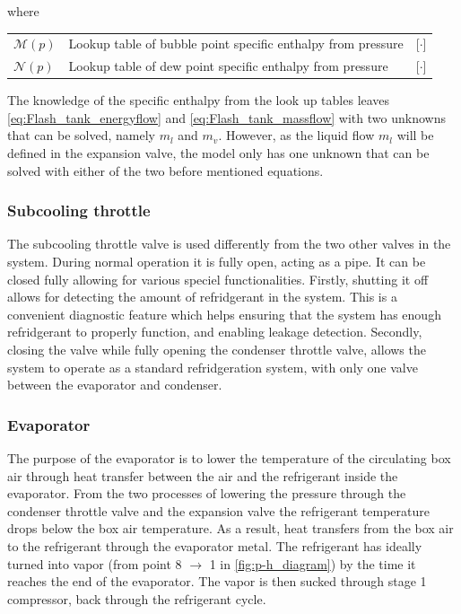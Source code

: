 where

\begin{center}
	\begin{tabular}{l p{8cm} l}
		$\mathcal{M}(p)$ & Lookup table of bubble point specific enthalpy from pressure & [$\cdot$] \\
		$\mathcal{N}(p)$ & Lookup table of dew point specific enthalpy from pressure    & [$\cdot$]
	\end{tabular}
\end{center}

The knowledge of the specific enthalpy from the look up tables leaves \cref{eq:Flash_tank_energyflow} and \cref{eq:Flash_tank_massflow} with two unknowns that can be solved, namely $ m_l $ and $ m_v $. However, as the liquid flow $ m_l $ will be defined in the expansion valve, the model only has one unknown that can be solved with either of the two before mentioned equations.

\subsubsection{Subcooling throttle}
The subcooling throttle valve is used differently from the two other valves in the system. During normal operation it is fully open, acting as a pipe. It can be closed fully allowing for various speciel functionalities. Firstly, shutting it off allows for detecting the amount of refridgerant in the system. This is a convenient diagnostic feature which helps ensuring that the system has enough refridgerant to properly function, and enabling leakage detection. Secondly, closing the valve while fully opening the condenser throttle valve, allows the system to operate as a standard refridgeration system, with only one valve between the evaporator and condenser.


\subsubsection{Evaporator}\label{sec:evaporator}
The purpose of the evaporator is to lower the temperature of the circulating box air through heat transfer between the air and the refrigerant inside the evaporator. From the two processes of lowering the pressure through the condenser throttle valve and the expansion valve the refrigerant temperature drops below the box air temperature. As a result, heat transfers from the box air to the refrigerant through the evaporator metal. The refrigerant has ideally turned into vapor (from point 8 $\rightarrow$ 1 in \cref{fig:p-h_diagram}) by the time it reaches the end of the evaporator. The vapor is then sucked through stage 1 compressor, back through the refrigerant cycle.

